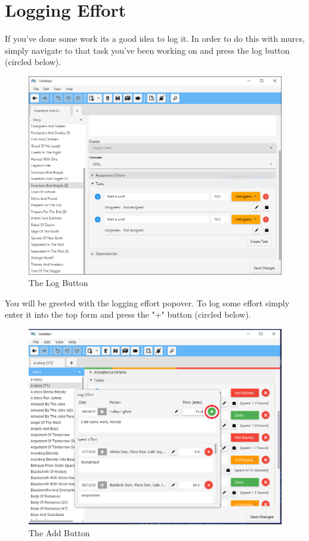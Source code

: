 \section{Logging Effort}

If you've done some work its a good idea to log it. In order to do this with murcs, simply navigate to that task you've been working on and press the log button (circled below).

\begin{figure}[H]
\centering
\includegraphics[width=\textwidth]{images/screenshots/logging1.PNG}
\caption{The Log Button}
\label{fig:new_project}
\end{figure}

You will be greeted with the logging effort popover. To log some effort simply enter it into the top form and press the "+" button (circled below). 

\begin{figure}[H]
\centering
\includegraphics[width=\textwidth]{images/screenshots/logging3.png}
\caption{The Add Button}
\label{fig:new_project}
\end{figure}

